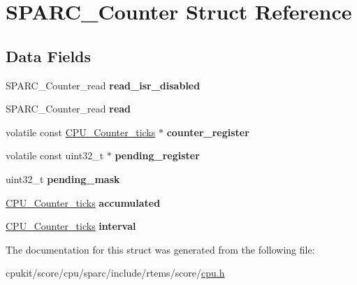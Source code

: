 \hypertarget{structSPARC__Counter}{}\section{S\+P\+A\+R\+C\+\_\+\+Counter Struct Reference}
\label{structSPARC__Counter}
\subsection*{Data Fields}
\begin{DoxyCompactItemize}
\item 
\mbox{\label{structSPARC__Counter_a195eaeb4c4404145a7834071074b7bf5}} 
S\+P\+A\+R\+C\+\_\+\+Counter\+\_\+read {\bfseries read\+\_\+isr\+\_\+disabled}
\item 
\mbox{\label{structSPARC__Counter_aba9cc1fbaeb6ef439e67ba35e26a5d6f}} 
S\+P\+A\+R\+C\+\_\+\+Counter\+\_\+read {\bfseries read}
\item 
\mbox{\label{structSPARC__Counter_abf960dd550d355a9c7dd5475ff3451a3}} 
volatile const \mbox{\hyperlink{no__cpu_2include_2rtems_2score_2cpu_8h_a67f8550aad58bccb6fcb4589894444ad}{C\+P\+U\+\_\+\+Counter\+\_\+ticks}} $\ast$ {\bfseries counter\+\_\+register}
\item 
\mbox{\label{structSPARC__Counter_a42d5f2f7db7b2f61bd7acb0cfb2ca330}} 
volatile const uint32\+\_\+t $\ast$ {\bfseries pending\+\_\+register}
\item 
\mbox{\label{structSPARC__Counter_a78bc69ae1ba8f249a60ebd36f38ff1da}} 
uint32\+\_\+t {\bfseries pending\+\_\+mask}
\item 
\mbox{\label{structSPARC__Counter_a1ddbed13c428694f5d0aaf28447ce112}} 
\mbox{\hyperlink{no__cpu_2include_2rtems_2score_2cpu_8h_a67f8550aad58bccb6fcb4589894444ad}{C\+P\+U\+\_\+\+Counter\+\_\+ticks}} {\bfseries accumulated}
\item 
\mbox{\label{structSPARC__Counter_ac8a0bbbd3bd825e6bd40a1c68bd1ee12}} 
\mbox{\hyperlink{no__cpu_2include_2rtems_2score_2cpu_8h_a67f8550aad58bccb6fcb4589894444ad}{C\+P\+U\+\_\+\+Counter\+\_\+ticks}} {\bfseries interval}
\end{DoxyCompactItemize}


The documentation for this struct was generated from the following file\+:\begin{DoxyCompactItemize}
\item 
cpukit/score/cpu/sparc/include/rtems/score/\mbox{\hyperlink{sparc_2include_2rtems_2score_2cpu_8h}{cpu.\+h}}\end{DoxyCompactItemize}
